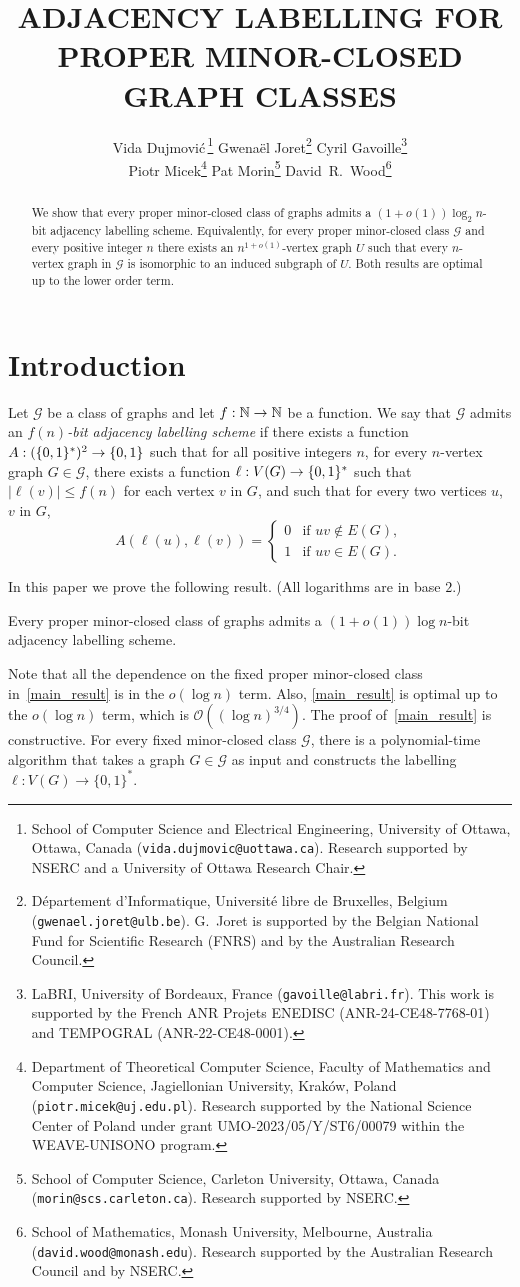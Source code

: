 \documentclass{patmorin}
\title{\MakeUppercase{\boldmath  Adjacency labelling for proper minor-closed graph classes}}
\author{
 Vida Dujmovi{\'c}\,\footnote{School of Computer Science and Electrical Engineering, University of Ottawa, Ottawa, Canada (\texttt{vida.dujmovic@uottawa.ca}). Research supported by NSERC and a University of Ottawa Research Chair.}
 \qquad
 Gwena\"el Joret\footnote{D\'epartement d'Informatique, Universit\'e libre de Bruxelles, Belgium ({\tt gwenael.joret@ulb.be}). G.\ Joret is supported by the Belgian National Fund for Scientific Research (FNRS) and by the Australian Research Council.}
 \qquad
 Cyril Gavoille\footnote{LaBRI, University of Bordeaux, France (\texttt{gavoille@labri.fr}). This work is supported by the French ANR Projets ENEDISC (ANR-24-CE48-7768-01) and TEMPOGRAL (ANR-22-CE48-0001).}\\[1ex]
 Piotr Micek\footnote{Department of Theoretical Computer Science, Faculty of Mathematics and Computer Science, Jagiellonian University, Kraków, Poland (\texttt{piotr.micek@uj.edu.pl}). Research supported by the National Science Center of Poland under grant UMO-2023/05/Y/ST6/00079 within the WEAVE-UNISONO program.}
 \qquad
 Pat Morin\footnote{School of Computer Science, Carleton University, Ottawa, Canada (\texttt{morin@scs.carleton.ca}). Research supported by NSERC.}
 \qquad
 David~R.~Wood\footnote{School of Mathematics, Monash University, Melbourne, Australia (\texttt{david.wood@monash.edu}). Research supported by the Australian Research Council and by NSERC.}
 }
\date{}
\renewcommand{\leq}{\leqslant}
\newcommand{\defin}[1]{\emph{\textcolor{brightmaroon}{#1}}}
\newcommand{\Oh}{\calO}
\DeclarePairedDelimiter{\set}{\{}{\}}
\newcommand{\calG}{\mathcal{G}}
\newcommand{\calO}{\mathcal{O}}
\begin{document}
\maketitle


\begin{abstract}
  We show that every proper minor-closed class of graphs admits a $(1+o(1))\log_2 n$-bit adjacency labelling scheme. Equivalently, for every proper minor-closed class $\calG$ and every positive integer $n$ there exists an $n^{1+o(1)}$-vertex graph $U$ such that every $n$-vertex graph in $\calG$ is isomorphic to an induced subgraph of $U$.  Both results are optimal up to the lower order term.
\end{abstract}

 \newpage
 \tableofcontents

  \newpage
  \setcounter{page}{1}
  \section{Introduction}
Let $\calG$ be a class of graphs and let $f:\mathbb{N}\to\mathbb{N}$ be a function.
We say that $\calG$ admits an \defin{$f(n)$-bit adjacency labelling scheme} if there exists a function $A:(\set{0,1}^*)^2\to\set{0,1}$ such that for all positive integers $n$, for every $n$-vertex graph $G\in\calG$, there exists a function $\ell: V(G)\to\set{0,1}^*$ such that
$|\ell(v)|\leq f(n)$ for each vertex $v$ in $G$, and such that
for every two vertices $u$, $v$ in $G$,
\[
A(\ell(u),\ell(v))=\begin{cases}
0&\textrm{if $uv\notin E(G)$},\\
1&\textrm{if $uv\in E(G)$}.
\end{cases}
\]

In this paper we prove the following result. (All logarithms are in base $2$.)

\begin{thm}
\label{main_result}
Every proper minor-closed class of graphs admits
a $(1+o(1))\log n$-bit adjacency labelling scheme.
\end{thm}


Note that all the dependence on the fixed proper minor-closed class in~\cref{main_result} is in the $o(\log n)$ term. Also, \cref{main_result} is optimal up to the $o(\log n)$ term,
which is $\Oh\left((\log n)^{3/4}\right)$.
The proof of~\cref{main_result} is constructive. For every fixed minor-closed class $\calG$, there is a polynomial-time algorithm that takes a graph $G\in\calG$ as input and constructs the labelling $\ell:V(G)\to\{0,1\}^*$.
\end{document}
